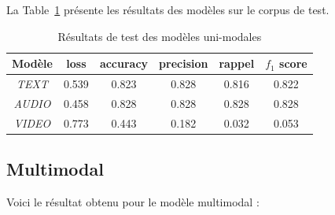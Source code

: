 \documentclass[a4paper]{article}
\begin{document}
La Table~\ref{tab: test unimodal} présente les résultats des modèles sur le corpus de test.

\begin{table}[H]
    \centering
    \begin{tabular}{|c|c|c|c|c|c|}
        \hline
        Modèle & loss & accuracy & precision & rappel & $f_1$ score\\
        \hline
        \textit{TEXT} & 0.539 & 0.823 & 0.828 & 0.816 & 0.822\\
        \hline
        \textit{AUDIO} & 0.458 & 0.828 & 0.828 & 0.828 & 0.828\\
        \hline
        \textit{VIDEO} & 0.773 & 0.443 & 0.182 & 0.032 & 0.053\\
        \hline
    \end{tabular}
    \caption{Résultats de test des modèles uni-modales}
    \label{tab: test unimodal}
\end{table}

\subsection{Multimodal}

Voici le résultat obtenu pour le modèle multimodal :
\end{document}
